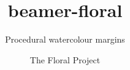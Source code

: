 \documentclass[aspectratio=169]{beamer}
\title{beamer-floral}
\subtitle{Procedural watercolour margins}
\author{The Floral Project}
\institute{beamer-floral}
\date{}
\begin{document}
\begin{frame}[plain]
  \titlepage
\end{frame}
\end{document}
